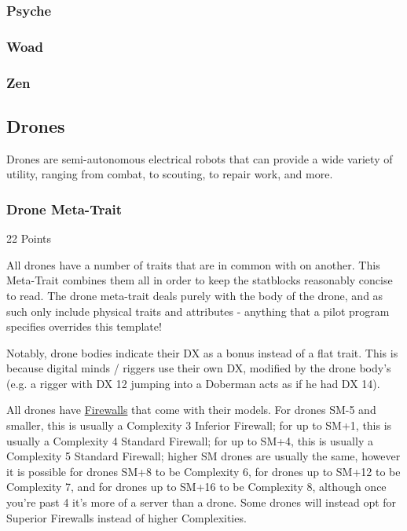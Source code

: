 \subsubsection{Psyche}

\subsubsection{Woad}

\subsubsection{Zen}



\subsection{Drones}\label{drones}

Drones are semi-autonomous electrical robots that can provide a wide variety of utility, ranging from combat, to scouting, to repair work, and more.

\subsubsection{Drone Meta-Trait}
\begin{flushright}
	22 Points
\end{flushright}

All drones have a number of traits that are in common with on another. This Meta-Trait combines them all in order to keep the statblocks reasonably concise to read. The drone meta-trait deals purely with the body of the drone, and as such only include physical traits and attributes - anything that a pilot program specifies overrides this template!

Notably, drone bodies indicate their DX as a bonus instead of a flat trait. This is because digital minds / riggers use their own DX, modified by the drone body's (e.g. a rigger with DX 12 jumping into a Doberman acts as if he had DX 14).

All drones have \hyperref[firewall]{Firewalls} that come with their models. For drones SM-5 and smaller, this is usually a Complexity 3 Inferior Firewall; for up to SM+1, this is usually a Complexity 4 Standard Firewall; for up to SM+4, this is usually a Complexity 5 Standard Firewall; higher SM drones are usually the same, however it is possible for drones SM+8 to be Complexity 6, for drones up to SM+12 to be Complexity 7, and for drones up to SM+16 to be Complexity 8, although once you're past 4 it's more of a server than a drone. Some drones will instead opt for Superior Firewalls instead of higher Complexities.

